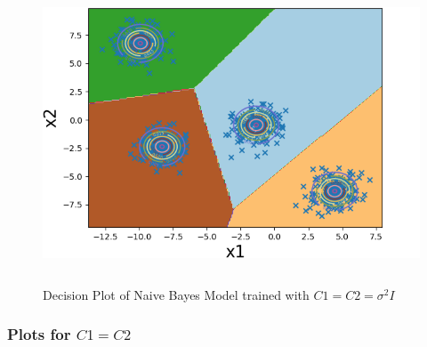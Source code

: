 \begin{figure}[!ht]
    \centering
    \includegraphics[height=3.5in]{Dataset_1a/Naive_Bayes_Classifier_case1_decision_plot.png}
    \caption{Decision Plot of Naive Bayes Model trained with $C1=C2=\sigma^2I$}
    \label{fig:8}
\end{figure}

\newpage
\subsubsection{Plots for $C1=C2$ }


